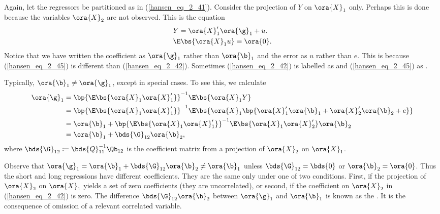 Again, let the regressors be partitioned as in (\ref{hansen_eq_2_41}). Consider the projection of $Y$ on $\ora{X}_1$ only. Perhaps this is done because the variables $\ora{X}_2$ are not observed. This is the equation 
\begin{equation}
    \label{hansen_eq_2_45}
    \begin{aligned}
        & Y = \ora{X}_1^{\prime} \ora{\g}_1 + u. \\
        & \E\bs{\ora{X}_1 u} = \ora{0}.
    \end{aligned}
\end{equation}
Notice that we have written the coefficient as $\ora{\g}_1$ rather than $\ora{\b}_1$ and the error as $u$ rather than $e$. This is because (\ref{hansen_eq_2_45}) is different than (\ref{hansen_eq_2_42}). Sometimes (\ref{hansen_eq_2_42}) is labelled as  and (\ref{hansen_eq_2_45}) as .

Typically, $\ora{\b}_1 \neq \ora{\g}_1$, except in special cases. To see this, we calculate 
\begin{equation}
    \notag 
    \begin{aligned}
        \ora{\g}_1 & = \bp{\E\bs{\ora{X}_1 \ora{X}_1^{\prime}}}^{-1} \E\bs{\ora{X}_1 Y} \\
        & = \bp{\E\bs{\ora{X}_1 \ora{X}_1^{\prime}}}^{-1} \E\bs{\ora{X}_1 \bp{\ora{X}_1^{\prime} \ora{\b}_1 + \ora{X}_2^{\prime} \ora{\b}_2 + e}} \\
        & = \ora{\b}_1 + \bp{\E\bs{\ora{X}_1 \ora{X}_1^{\prime}}}^{-1} \E\bs{\ora{X}_1 \ora{X}_2^{\prime}} \ora{\b}_2 \\
        & = \ora{\b}_1 + \bds{\G}_{12} \ora{\b}_2,
    \end{aligned}
\end{equation}
where $\bds{\G}_{12} \coloneqq \bds{Q}_{11}^{-1} \Qb_{12}$ is the coefficient matrix from a projection of $\ora{X}_2$ on $\ora{X}_1$.

Observe that $\ora{\g}_1 = \ora{\b}_1 + \bds{\G}_{12} \ora{\b}_2 \neq \ora{\b}_1$ unless $\bds{\G}_{12} = \bds{0}$ or $\ora{\b}_2 = \ora{0}$. Thus the short and long regressions have different coefficients. They are the same only under one of two conditions. First, if the projection of $\ora{X}_2$ on $\ora{X}_1$ yields a set of zero coefficients (they are uncorrelated), or second, if the coefficient on $\ora{X}_2$ in (\ref{hansen_eq_2_42}) is zero. The difference $\bds{\G}_{12} \ora{\b}_2$ between $\ora{\g}_1$ and $\ora{\b}_1$ is known as the .  It is the consequence of omission of a relevant correlated variable.

